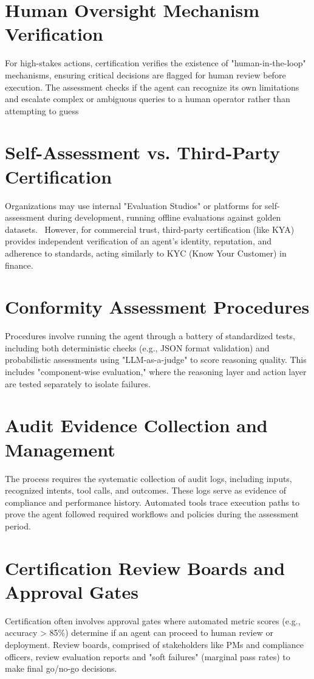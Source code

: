 \begin{TNtwocol}
\section{Human Oversight Mechanism Verification}
For high-stakes actions, certification verifies the existence of "human-in-the-loop" mechanisms, ensuring critical decisions are flagged for human review before execution. The assessment checks if the agent can recognize its own limitations and escalate complex or ambiguous queries to a human operator rather than attempting to guess
\section{Self-Assessment vs. Third-Party Certification}
Organizations may use internal "Evaluation Studios" or platforms for self-assessment during development, running offline evaluations against golden datasets.~\cite{huggingface2024} However, for commercial trust, third-party certification (like KYA) provides independent verification of an agent's identity, reputation, and adherence to standards, acting similarly to KYC (Know Your Customer) in finance.
\section{Conformity Assessment Procedures }
Procedures involve running the agent through a battery of standardized tests, including both deterministic checks (e.g., JSON format validation) and probabilistic assessments using "LLM-as-a-judge" to score reasoning quality. This includes "component-wise evaluation," where the reasoning layer and action layer are tested separately to isolate failures.~\cite{deepeval_ai_agent_evaluation}
\section{Audit Evidence Collection and Management }
The process requires the systematic collection of audit logs, including inputs, recognized intents, tool calls, and outcomes. These logs serve as evidence of compliance and performance history. Automated tools trace execution paths to prove the agent followed required workflows and policies during the assessment period.
\section{Certification Review Boards and Approval Gates }
Certification often involves approval gates where automated metric scores (e.g., accuracy > 85\%) determine if an agent can proceed to human review or deployment. Review boards, comprised of stakeholders like PMs and compliance officers, review evaluation reports and "soft failures" (marginal pass rates) to make final go/no-go decisions.~\cite{gu2024agentsmithsingleimage}

\end{TNtwocol}
